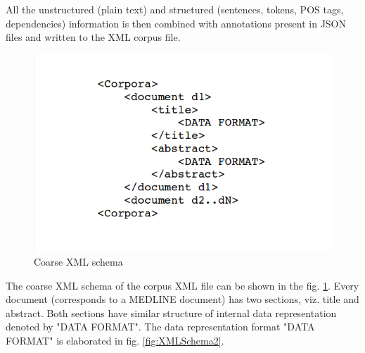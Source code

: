 \begin{enumerate}
All the unstructured (plain text) and structured (sentences, tokens, POS tags, dependencies) information is then combined with annotations present in JSON files and written to the XML corpus file.

\begin{figure}
\centering
\includegraphics[scale=0.4]{figures/XMLSchema1.png}
\caption{Coarse XML schema}\label{fig:XMLSchema1}
\end{figure}

The coarse XML schema of the corpus XML file can be shown in the fig. \ref{fig:XMLSchema1}. Every document (corresponds to a MEDLINE document) has two sections, viz. title and abstract. Both sections have similar structure of internal data representation denoted by "DATA FORMAT". The data representation format "DATA FORMAT" is elaborated in fig. \ref{fig:XMLSchema2}.


\end{enumerate}
